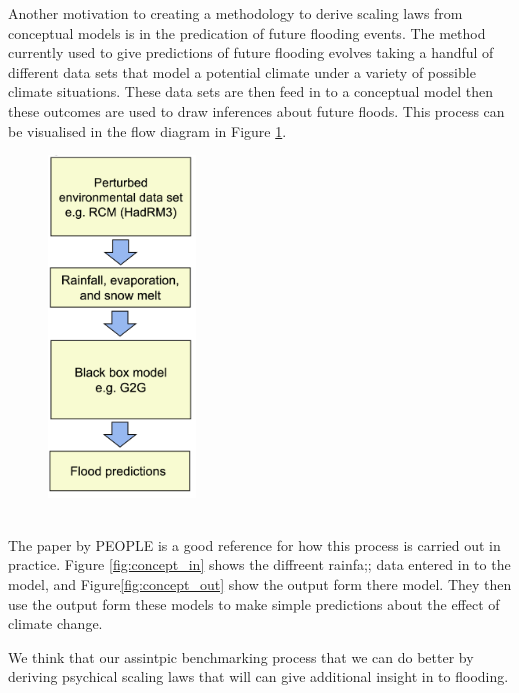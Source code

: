\documentclass[11pt]{article}
\begin{document}
\begin{minipage}{0.45\textwidth}
    Another motivation to creating a methodology to derive scaling laws from conceptual models is in the predication of future flooding events. 
    The method currently used to give predictions of future flooding evolves taking a handful of different data sets that model a potential climate under a variety of possible climate situations. These data sets are then feed in to a conceptual model then these outcomes are used to draw inferences about future floods.
    This process can be visualised in the flow diagram in Figure \ref{fig:flow}.
\end{minipage}
\hspace{0.05\textwidth}
\begin{minipage}{0.45\textwidth}
    \begin{figure}[H]
    \centering
    \includegraphics[width=0.35\textwidth]{Figs/flow.png}
    \label{fig:flow}
\end{figure}
\end{minipage}
\\


The paper by PEOPLE is a good reference for how this process is carried out in practice. Figure \ref{fig:concept_in} shows the diffreent rainfa;; data entered in to the model, and Figure\ref{fig:concept_out} show the output form there model. They then use the output form these models to make simple predictions about the effect of climate change.

We think that our assintpic benchmarking process that we can do better by deriving psychical scaling laws that will can give additional insight in to flooding.
\end{document}
